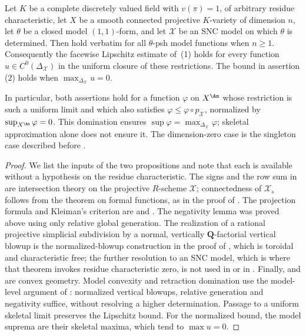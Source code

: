 \begin{proposition}
\label{prop:ch22-characteristic-free-estimates}
Let $K$ be a complete discretely valued field with $v(\pi)=1$, of
arbitrary residue characteristic, let $X$ be a smooth connected projective
$K$-variety of dimension $n$, let $\theta$ be a closed model
$(1,1)$-form, and let $\mathcal X$ be an SNC model on which
$\theta$ is determined.  Then
 hold verbatim for
all $\theta$-psh model functions when $n\geq1$.  Consequently the
facewise Lipschitz estimate of \,(1)
holds for every function $u\in C^0(\Delta_{\mathcal X})$ in the uniform
closure of these restrictions.  The bound in assertion (2) holds when
$\max_{\Delta_{\mathcal X}}u=0$.

In particular, both assertions hold for a function $\varphi$ on $X^{\An}$
whose restriction is such a uniform limit and which also satisfies
$\varphi\leq\varphi\circ p_{\mathcal X}$, normalized by
$\sup_{X^{\An}}\varphi=0$.  This domination ensures
$\sup\varphi=\max_{\Delta_{\mathcal X}}\varphi$; skeletal approximation
alone does not ensure it.  The dimension-zero case is the singleton case
described before .
\end{proposition}

\begin{proof}
We list the inputs of the two propositions and note that each is available
without a hypothesis on the residue characteristic.  The signs and the row
sum in  are intersection theory on the
projective $R$-scheme $\mathcal X$; connectedness of $\mathcal X_s$
follows from the theorem on formal functions, as in the proof of
.  The projection formula and Kleiman's criterion
are  and \cite[Section~1.4]{KM08}.  The negativity
lemma  was proved above using only relative global
generation.  The realization of a rational projective simplicial subdivision
by a normal, vertically $\mathbf Q$-factorial vertical blowup is the
normalized-blowup construction in the proof of
, which is toroidal and characteristic free;
the further resolution to an SNC model, which is where that theorem invokes
residue characteristic zero, is not used in
 or in
.  Finally,
 and  are convex geometry.
Model convexity and
retraction domination use the model-level argument of
: normalized vertical blowups,
relative generation and negativity suffice, without resolving a higher
determination.  Passage to a uniform skeletal limit preserves the Lipschitz
bound.  For the normalized bound, the model suprema are their skeletal
maxima, which tend to $\max u=0$.
\end{proof}

